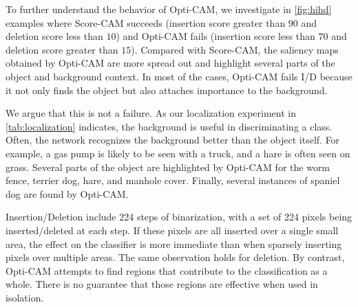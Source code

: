 To further understand the behavior of Opti-CAM, we investigate in \autoref{fig:hihd} examples where Score-CAM succeeds (insertion score greater than $90$ and deletion score less than $10$) and Opti-CAM fails (insertion score less than $70$ and deletion score greater than $15$). Compared with Score-CAM, the saliency maps obtained by Opti-CAM are more spread out and highlight several parts of the object and background context. In most of the cases, Opti-CAM fails I/D because it not only finds the object but also attaches importance to the background.

We argue that this is not a failure. As our localization experiment in \autoref{tab:localization} indicates, the background is useful in discriminating a class. Often, the network recognizes the background better than the object itself. For example, a gas pump is likely to be seen with a truck, and a hare is often seen on grass. Several parts of the object are highlighted by Opti-CAM for the worm fence, terrier dog, hare, and manhole cover. Finally, several instances of spaniel dog are found by Opti-CAM.

Insertion/Deletion include 224 steps of binarization, with a set of 224 pixels being inserted/deleted at each step. If these pixels are all inserted over a single small area, the effect on the classifier is more immediate than when sparsely inserting pixels over multiple areas. The same observation holds for deletion. By contrast, Opti-CAM attempts to find regions that contribute to the classification as a whole. There is no guarantee that those regions are effective when used in isolation.

